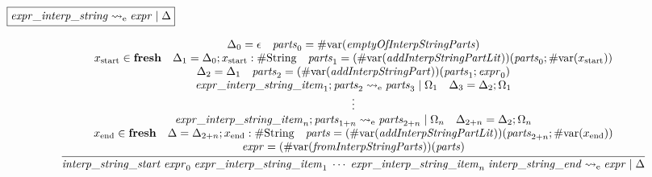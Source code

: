 $\fbox{$\mathit{expr\_interp\_string} \rightsquigarrow_\mathrm{e} \mathit{expr} \mid \Delta$}$

\begin{gather*}
    \infer{\mathit{interp\_string\_start}\; \mathit{expr}_0\; \mathit{expr\_interp\_string\_item}_1\; \cdots\; \mathit{expr\_interp\_string\_item}_n\; \mathit{interp\_string\_end} \rightsquigarrow_\mathrm{e} \mathit{expr} \mid \Delta}{
        \begin{array}{c}
            \Delta_0 = \epsilon
            \hspace{1em}
            \mathit{parts}_0 = \mathrm{\#var}(\mathit{emptyOfInterpStringParts})
            \\
            x_\mathrm{start} \in \mathbf{fresh}
            \hspace{1em}
            \Delta_1 = \Delta_0; x_\mathrm{start}: \mathrm{\#String}
            \hspace{1em}
            \mathit{parts}_1 = (\mathrm{\#var}(\mathit{addInterpStringPartLit}))(\mathit{parts}_0; \mathrm{\#var}(x_\mathrm{start}))
            \\
            \Delta_2 = \Delta_1
            \hspace{1em}
            \mathit{parts}_2 = (\mathrm{\#var}(\mathit{addInterpStringPart}))(\mathit{parts}_1; \mathit{expr}_0)
            \\
            \mathit{expr\_interp\_string\_item}_1; \mathit{parts}_2 \rightsquigarrow_\mathrm{e} \mathit{parts}_3 \mid \Omega_1
            \hspace{1em}
            \Delta_3 = \Delta_2; \Omega_1
            \\
            \vdots
            \\
            \mathit{expr\_interp\_string\_item}_n; \mathit{parts}_{1 + n} \rightsquigarrow_\mathrm{e} \mathit{parts}_{2 + n} \mid \Omega_n
            \hspace{1em}
            \Delta_{2 + n} = \Delta_2; \Omega_n
            \\
            x_\mathrm{end} \in \mathbf{fresh}
            \hspace{1em}
            \Delta = \Delta_{2 + n}; x_\mathrm{end}: \mathrm{\#String}
            \hspace{1em}
            \mathit{parts} = (\mathrm{\#var}(\mathit{addInterpStringPartLit}))(\mathit{parts}_{2 + n}; \mathrm{\#var}(x_\mathrm{end}))
            \\
            \mathit{expr} = (\mathrm{\#var}(\mathit{fromInterpStringParts}))(\mathit{parts})
        \end{array}
    }
\end{gather*}

